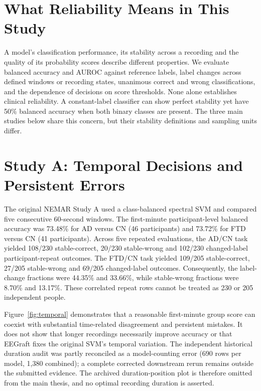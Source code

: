 \section{What Reliability Means in This Study}
A model's classification performance, its stability across a recording and the quality of its probability scores describe different properties. We evaluate balanced accuracy and AUROC against reference labels, label changes across defined windows or recording states, unanimous correct and wrong classifications, and the dependence of decisions on score thresholds. None alone establishes clinical reliability. A constant-label classifier can show perfect stability yet have 50\% balanced accuracy when both binary classes are present. The three main studies below share this concern, but their stability definitions and sampling units differ.

\section{Study A: Temporal Decisions and Persistent Errors}
The original NEMAR Study A used a class-balanced spectral SVM and compared five consecutive 60-second windows. The first-minute participant-level balanced accuracy was 73.48\% for AD versus CN (46 participants) and 73.72\% for FTD versus CN (41 participants). Across five repeated evaluations, the AD/CN task yielded 108/230 stable-correct, 20/230 stable-wrong and 102/230 changed-label participant-repeat outcomes. The FTD/CN task yielded 109/205 stable-correct, 27/205 stable-wrong and 69/205 changed-label outcomes. Consequently, the label-change fractions were 44.35\% and 33.66\%, while stable-wrong fractions were 8.70\% and 13.17\%. These correlated repeat rows cannot be treated as 230 or 205 independent people.


Figure~\ref{fig:temporal} demonstrates that a reasonable first-minute group score can coexist with substantial time-related disagreement and persistent mistakes. It does not show that longer recordings necessarily improve accuracy or that EEGraft fixes the original SVM's temporal variation. The independent historical duration audit was partly reconciled as a model-counting error (690 rows per model, 1,380 combined); a complete corrected downstream rerun remains outside the submitted evidence. The archived duration-position plot is therefore omitted from the main thesis, and no optimal recording duration is asserted.

